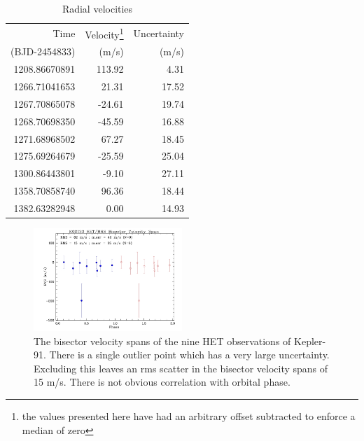 \documentclass[apjl]{emulateapj}
\begin{document}



\begin{table}\label{tab:rv}
\centering
\caption{Radial velocities}
\begin{tabular}{r r r}
Time & Velocity\footnote{the values presented here have had an arbitrary offset subtracted to enforce a median of zero}  & Uncertainty \\
(BJD-2454833) & (m/s) & (m/s)\\
\hline
1208.86670891	&	113.92 & 4.31\\
1266.71041653	& 21.31&17.52\\
1267.70865078		&	-24.61 &19.74\\
1268.70698350		&	-45.59&16.88\\
1271.68968502		&	67.27&18.45\\
1275.69264679	&	-25.59&25.04\\
1300.86443801 & -9.10&27.11\\
1358.70858740 & 96.36&18.44\\
1382.63282948 & 0.00&14.93\\
\hline
\end{tabular}
\end{table}


\begin{figure}
\includegraphics[width=0.50\textwidth]{k02133_bvs_phas1.jpg}
\caption{The bisector velocity spans of the nine HET observations of Kepler-91. There is a single outlier point which has a very large uncertainty. Excluding this leaves an rms scatter in the bisector velocity spans of 15 m/s. There is not obvious correlation with orbital phase.}
\label{fig:bisectors}
\end{figure}
\end{document}
